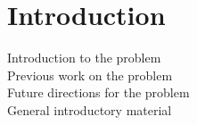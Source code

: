 \chapter{Introduction}	%
Introduction to the problem \\
Previous work on the problem \\
Future directions for the problem \\
General introductory material \\
\endinput